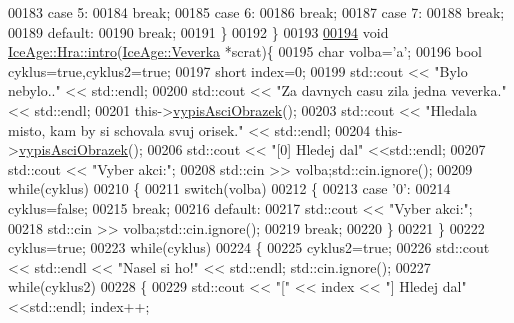 \begin{DoxyCode}
00183         \textcolor{keywordflow}{case} 5:
00184              \textcolor{keywordflow}{break};
00185         \textcolor{keywordflow}{case} 6:
00186              \textcolor{keywordflow}{break};
00187         \textcolor{keywordflow}{case} 7:
00188             \textcolor{keywordflow}{break};
00189         \textcolor{keywordflow}{default}:
00190             \textcolor{keywordflow}{break};
00191         \}
00192 \}
00193 
\hypertarget{Hra_8cpp_source.tex_l00194}{}\hyperlink{classIceAge_1_1Hra_acca9aa3823d78712b66e371fabbaf351}{00194} \textcolor{keywordtype}{void} \hyperlink{classIceAge_1_1Hra_acca9aa3823d78712b66e371fabbaf351}{IceAge::Hra::intro}(\hyperlink{classIceAge_1_1Veverka}{IceAge::Veverka} *scrat)\{
00195     \textcolor{keywordtype}{char} volba=\textcolor{charliteral}{'a'};
00196     \textcolor{keywordtype}{bool} cyklus=\textcolor{keyword}{true},cyklus2=\textcolor{keyword}{true}; 
00197     \textcolor{keywordtype}{short} index=0;
00199     std::cout << \textcolor{stringliteral}{"Bylo nebylo.."} << std::endl;
00200     std::cout << \textcolor{stringliteral}{"Za davnych casu zila jedna veverka."} << std::endl;
00201     this->\hyperlink{classIceAge_1_1Hra_a28f302456724c7a0901e16a940ea6c67}{vypisAsciObrazek}();
00203     std::cout << \textcolor{stringliteral}{"Hledala misto, kam by si schovala svuj orisek."} << std::endl;
00204     this->\hyperlink{classIceAge_1_1Hra_a28f302456724c7a0901e16a940ea6c67}{vypisAsciObrazek}();
00206     std::cout << \textcolor{stringliteral}{"[0] Hledej dal"} <<std::endl;
00207     std::cout << \textcolor{stringliteral}{"Vyber akci:"};
00208     std::cin >> volba;std::cin.ignore();
00209     \textcolor{keywordflow}{while}(cyklus)
00210     \{
00211         \textcolor{keywordflow}{switch}(volba)
00212         \{
00213             \textcolor{keywordflow}{case} \textcolor{charliteral}{'0'}:
00214                 cyklus=\textcolor{keyword}{false};
00215                 \textcolor{keywordflow}{break};
00216             \textcolor{keywordflow}{default}:
00217                 std::cout << \textcolor{stringliteral}{"Vyber akci:"};
00218                 std::cin >> volba;std::cin.ignore();
00219                 \textcolor{keywordflow}{break};
00220         \}
00221     \}
00222     cyklus=\textcolor{keyword}{true};
00223     \textcolor{keywordflow}{while}(cyklus)
00224     \{
00225         cyklus2=\textcolor{keyword}{true};
00226         std::cout << std::endl << \textcolor{stringliteral}{"Nasel si ho!"} << std::endl; std::cin.ignore();
00227         \textcolor{keywordflow}{while}(cyklus2)
00228         \{
00229             std::cout << \textcolor{stringliteral}{"["} << index << \textcolor{stringliteral}{"] Hledej dal"} <<std::endl; index++;

\end{DoxyCode}
